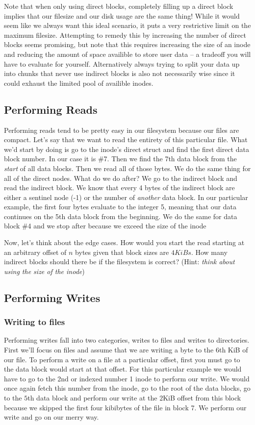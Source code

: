 Note that when only using direct blocks, completely filling up a direct block implies that our filesize and our disk usage are the same thing!
While it would seem like we always want this ideal scenario, it puts a very restrictive limit on the maximum filesize.
Attempting to remedy this by increasing the number of direct blocks seems promising, but note that this requires increasing the size of an inode and reducing the amount of space availible to store user data -- a tradeoff you will have to evaluate for yourself.
Alternatively always trying to split your data up into chunks that never use indirect blocks is also not necessarily wise since it could exhaust the limited pool of availible inodes.


\subsection{Performing Reads}

Performing reads tend to be pretty easy in our filesystem because our files are compact.
Let's say that we want to read the entirety of this particular file.
What we'd start by doing is go to the inode's direct struct and find the first direct data block number.
In our case it is \#7.
Then we find the 7th data block from the \textit{start} of all data blocks.
Then we read all of those bytes.
We do the same thing for all of the direct nodes.
What do we do after? 
We go to the indirect block and read the indirect block.
We know that every 4 bytes of the indirect block are either a sentinel node (-1) or the number of \textit{another} data block.
In our particular example, the first four bytes evaluate to the integer 5, meaning that our data continues on the 5th data block from the beginning.
We do the same for data block \#4 and we stop after because we exceed the size of the inode

Now, let's think about the edge cases.
How would you start the read starting at an arbitrary offset of $n$ bytes given that block sizes are $4 KiBs$.
How many indirect blocks should there be if the filesystem is correct? (Hint: \textit{think about using the size of the inode})

\subsection{Performing Writes}
\subsubsection{Writing to files}
Performing writes fall into two categories, writes to files and writes to directories.
First we'll focus on files and assume that we are writing a byte to the $6$th KiB of our file.
To perform a write on a file at a particular offset, first you must go to the data block would start at that offset.
For this particular example we would have to go to the 2nd or indexed number 1 inode to perform our write.
We would once again fetch this number from the inode, go to the root of the data blocks, go to the $5$th data block and perform our write at the $2$KiB offset from this block because we skipped the first four kibibytes of the file in block 7.
We perform our write and go on our merry way.

